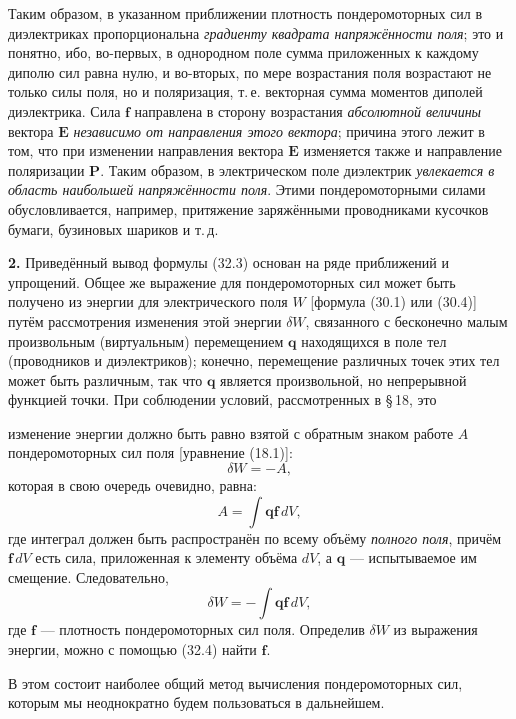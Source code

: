 \documentclass[a4paper,12pt]{article}
\begin{document}
Таким образом, в указанном приближении плотность пондеромоторных сил в
диэлектриках пропорциональна \textit{градиенту квадрата напряжённости
поля}; это и понятно, ибо, во-первых, в однородном поле сумма
приложенных к каждому диполю сил равна нулю, и во-вторых, по мере
возрастания поля возрастают не только силы поля, но и поляризация,
т.\,е. векторная сумма моментов диполей диэлектрика. Сила $\mathbf{f}$
направлена в сторону возрастания \textit{абсолютной величины} вектора
$\mathbf{E}$ \textit{независимо от направления этого вектора}; причина
этого лежит в том, что при изменении направления вектора $\mathbf{E}$
изменяется также и направление поляризации $\mathbf{P}$. Таким образом,
в электрическом поле диэлектрик \textit{увлекается в область наибольшей
напряжённости поля}. Этими пондеромоторными силами обусловливается,
например, притяжение заряжёнными проводниками кусочков бумаги,
бузиновых шариков и т.\,д.

\textbf{2.} Приведённый вывод формулы (32.3) основан на ряде
приближений и упрощений. Общее же выражение для пондеромоторных сил
может быть получено из энергии для электрического поля $W$ [формула
(30.1) или (30.4)] путём рассмотрения изменения этой энергии $\delta W$,
связанного с бесконечно малым произвольным (виртуальным) перемещением
$\mathbf{q}$ находящихся в поле тел (проводников и диэлектриков);
конечно, перемещение различных точек этих тел может быть различным, так
что $\mathbf{q}$ является произвольной, но непрерывной функцией точки.
При соблюдении условий, рассмотренных в §\,18, это


изменение энергии должно быть равно взятой с обратным знаком работе $A$
пондеромоторных сил поля [уравнение (18.1)]:
$$
    \delta W = -A,
$$
которая в свою очередь очевидно, равна:
$$
    A = \int \mathbf{q}\mathbf{f}\,dV,
$$
где интеграл должен быть распространён по всему объёму \textit{полного
поля}, причём $\mathbf{f}\,dV$ есть сила, приложенная к элементу объёма
$dV$, а $\mathbf{q}$ — испытываемое им смещение. Следовательно,
\begin{equation}
    \delta W = -\int \mathbf{q}\mathbf{f}\,dV,
    \tag{32.4}
\end{equation}
где $\mathbf{f}$ — плотность пондеромоторных сил поля. Определив
$\delta W$ из выражения энергии, можно с помощью (32.4) найти
$\mathbf{f}$.

В этом состоит наиболее общий метод вычисления пондеромоторных сил,
которым мы неоднократно будем пользоваться в дальнейшем.
\end{document}

